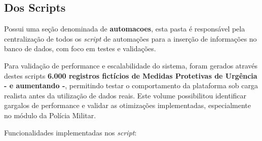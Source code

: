 \subsection{Dos Scripts}\label{script}
\par Possui uma seção denominada de \textbf{automacoes}, esta pasta é responsável pela centralização de todos os \textit{script} de automações para a inserção de informações no banco de dados, com foco em testes e validações.

\par Para validação de performance e escalabilidade do sistema, foram gerados através destes scripts \textbf{6.000 registros fictícios de Medidas Protetivas de Urgência - e aumentando -}, permitindo testar o comportamento da plataforma sob carga realista antes da utilização de dados reais. Este volume possibilitou identificar gargalos de performance e validar as otimizações implementadas, especialmente no módulo da Polícia Militar.

\par Funcionalidades implementadas nos \textit{script}:


